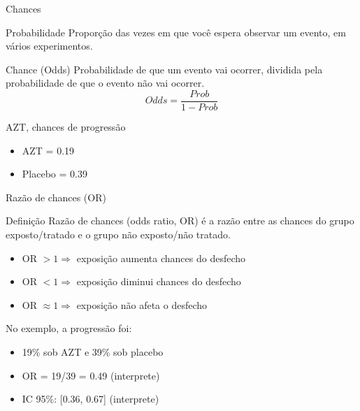 \documentclass{beamer}
\begin{document}
\begin{frame}{Chances}
  \begin{block}{Probabilidade}
    Proporção das vezes em que você espera observar um evento, em vários experimentos.
  \end{block}
  \begin{block}{Chance (Odds)}
    Probabilidade de que um evento vai ocorrer, dividida pela probabilidade de que o evento não vai ocorrer.
    \begin{displaymath}
      Odds = \frac{Prob}{1- Prob}
    \end{displaymath}
  \end{block}
  \begin{exampleblock}{AZT, chances de progressão}
    \begin{itemize}
    \item AZT = 0.19
    \item Placebo = 0.39
    \end{itemize}
  \end{exampleblock}
\end{frame}

\begin{frame}{Razão de chances (OR)}
  \begin{block}{Definição}
    Razão de chances (odds ratio, OR) é a razão entre as chances do grupo exposto/tratado e o grupo não exposto/não tratado.
  \end{block}
  \begin{itemize}
  \item OR $> 1 \Rightarrow$ exposição aumenta chances do desfecho
  \item OR $< 1 \Rightarrow$ exposição diminui chances do desfecho
  \item OR $\approx 1 \Rightarrow$ exposição não afeta o desfecho
  \end{itemize}
  \begin{exampleblock}{No exemplo, a progressão foi:}
    \begin{itemize}
    \item 19\% sob AZT e 39\% sob placebo
    \item OR = 19/39 = 0.49 (interprete)
    \item<2-> IC 95\%: [0.36, 0.67] (interprete)
    \end{itemize}
  \end{exampleblock}
\end{frame}
\end{document}
